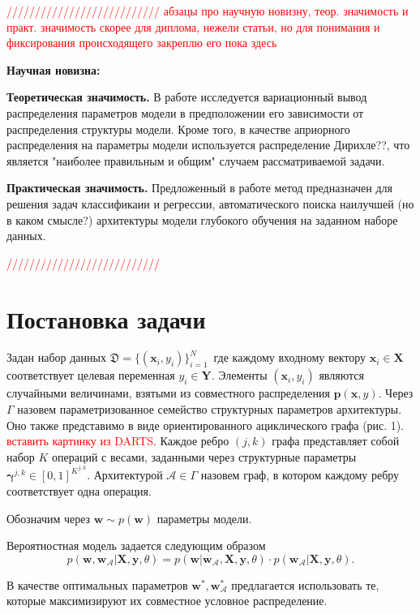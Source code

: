 \documentclass[12pt, twoside]{article}
\begin{document}
\bigskip
\textcolor{red}{/////////////////////////// абзацы про научную новизну, теор. значимость и практ. значимость скорее для диплома, нежели статьи, но для понимания и фиксирования происходящего закреплю его пока здесь}

\textbf{Научная новизна:}

\textbf{Теоретическая значимость.} В работе исследуется вариационный вывод  распределения параметров модели в предположении его зависимости от распределения структуры модели. Кроме того, в качестве априорного распределения на параметры модели используется распределение Дирихле??, что является "наиболее правильным и общим" случаем рассматриваемой задачи.

\textbf{Практическая значимость.} Предложенный в работе метод предназначен для решения задач классификаии и регрессии, автоматического поиска наилучшей (но в каком смысле?) архитектуры модели глубокого обучения на заданном наборе данных.

\textcolor{red}{///////////////////////////}


\section{Постановка задачи}

Задан набор данных $\mathfrak{D} = \{(\mathbf{x}_i, y_i)\}_{i=1}^{N}$\, где каждому входному вектору $\mathbf{x}_i\in \mathbf{X}$ соответствует целевая переменная $y_i\in \mathbf{Y}$. Элементы $(\mathbf{x}_i, y_i)$ являются случайными величинами, взятыми из совместного распределения $\mathbf{p}(\mathbf{x}, y)$. Через $\Gamma$ назовем параметризованное семейство структурных параметров архитектуры. Оно также представимо в виде ориентированного ациклического графа (рис. 1). \textcolor{red}{вставить картинку из DARTS}. Каждое ребро $(j, k)$ графа представляет собой набор $K$ операций с весами, заданными через структурные параметры $\mathbf{\gamma}^{j, k}\in [0, 1]^{K^{j, k}}$. Архитектурой $\mathcal{A}\in \Gamma$ назовем граф, в котором каждому ребру соответствует одна операция. 

Обозначим через $\mathbf{w} \sim p(\mathbf{w})$ параметры модели.

Вероятностная модель задается следующим образом
$$p(\mathbf{w}, \mathbf{w_{\mathcal{A}}}|\mathbf{X}, \mathbf{y}, \theta) = p(\mathbf{w}|\mathbf{w_{\mathcal{A}}}, \mathbf{X}, \mathbf{y}, \theta)\cdot p(\mathbf{w_{\mathcal{A}}}|\mathbf{X}, \mathbf{y}, \theta).$$

В качестве оптимальных параметров $\mathbf{w}^{*}, \mathbf{w^{*}_{\mathcal{A}}}$ предлагается использовать те, которые максимизируют их совместное условное распределение.
\end{document}
